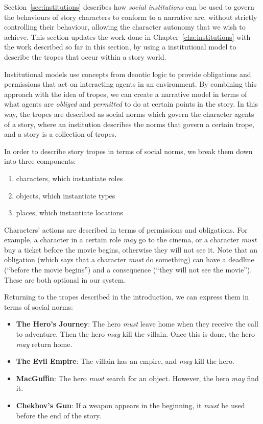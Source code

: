 \documentclass[11pt]{report}
\begin{document}
Section~\ref{sec:institutions} describes how \emph{social institutions} can be
used to govern the behaviours of story characters to conform to a narrative arc,
without strictly controlling their behaviour, allowing the character autonomy
that we wish to achieve. This section updates the work done in
Chapter~\ref{cha:institutions} with the work described so far in this section, by using a institutional model to describe the tropes that occur within a story world.

Institutional models use concepts from deontic logic to provide obligations and permissions that act on interacting agents in an environment. By combining this approach with the idea of tropes, we can create a narrative model in terms of what agents are \emph{obliged} and \emph{permitted} to do at certain points in the story. In this way, the tropes are described as social norms which govern the character agents of a story, where an institution describes the norms that govern a certain trope, and a story is a collection of tropes.

In order to describe story tropes in terms of social norms, we break them down into three components:

\begin{enumerate}
\item characters, which instantiate roles
\item objects, which instantiate types
\item places, which instantiate locations
\end{enumerate}

Characters' actions are described in terms of permissions and obligations. For example, a character in a certain role \emph{may} go to the cinema, or a character \emph{must} buy a ticket before the movie begins, otherwise they will not see it. Note that an obligation (which says that a character \emph{must} do something) can have a deadline (``before the movie begins'') and a consequence (``they will not see the movie''). These are both optional in our system.

Returning to the tropes described in the introduction, we can express them in terms of social norms:

\begin{itemize}
  \item \textbf{The Hero's Journey}: The hero \emph{must} leave home when they receive the call to adventure. Then the hero \emph{may} kill the villain. Once this is done, the hero \emph{may} return home.
  \item \textbf{The Evil Empire}: The villain has an empire, and \emph{may} kill the hero.
  \item \textbf{MacGuffin}: The hero \emph{must} search for an object. However, the hero \emph{may} find it.
  \item \textbf{Chekhov's Gun}: If a weapon appears in the beginning, it \emph{must} be used before the end of the story.
\end{itemize}
\end{document}
